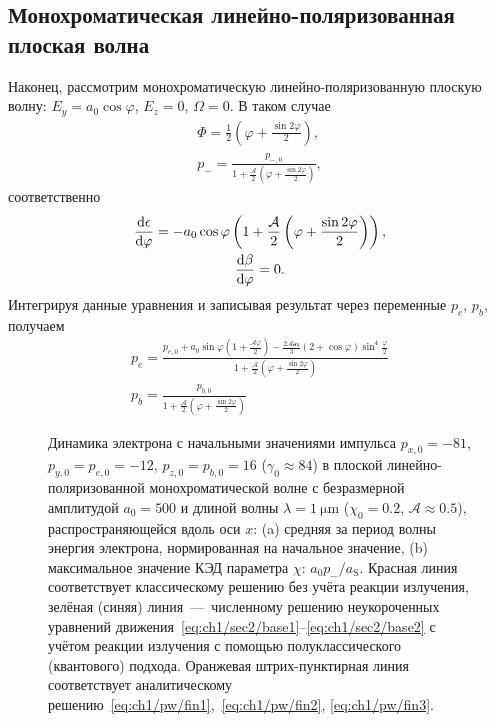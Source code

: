 \subsection{Монохроматическая линейно-поляризованная плоская волна}
\label{sub:ch1/sec6/LPW}
Наконец, рассмотрим монохроматическую линейно-поляризованную плоскую волну: $E_y=a_0\cos\varphi$, $E_z=0$, $\Omega=0$.
В таком случае
\begin{gather}
    \Phi = \frac{1}{2} \left( \varphi + \frac{\sin2\varphi}{2} \right), \\
    \label{eq:ch1/pw/fin1}
    p_- = \frac{p_{-, 0}}{1 + \frac{\mathcal{A}}{2} \left( \varphi + \frac{\sin2\varphi}{2} \right)},
\end{gather}
соответственно
\begin{gather}
    \dv{\epsilon}{\varphi} =  -a_0 \cos\varphi \left(1+\frac{\mathcal{A}}{2} \left( \varphi + \frac{\sin2\varphi}{2} \right)\right) , \\
    \dv{\beta}{\varphi} = 0.
\end{gather}
Интегрируя данные уравнения и записывая результат через переменные $p_e$, $p_b$, получаем
\begin{gather}
    \label{eq:ch1/pw/fin2}
    p_e = \frac{p_{e,0}+a_0\sin\varphi\left(1 + \frac{\mathcal{A}\varphi}{2}\right) - \frac{2 \mathcal{Aa_0}}{3} (2 + \cos\varphi)\sin^4\frac{\varphi}{2}}{1+\frac{\mathcal{A}}{2} \left( \varphi + \frac{\sin2\varphi}{2} \right)} \\
    \label{eq:ch1/pw/fin3}
    p_b = \frac{p_{b, 0}}{1+\frac{\mathcal{A}}{2} \left( \varphi + \frac{\sin2\varphi}{2} \right)}
\end{gather}

\begin{figure}[ht]
    \caption[Динамика электрона в линейно-поляризованной монохроматической плоской волне]{
    Динамика электрона с начальными значениями импульса $p_{x, 0} = -81$, $p_{y, 0} = p_{e, 0} = -12$, $p_{z, 0} = p_{b,0} = 16$ ($\gamma_0 \approx 84$) в плоской линейно-поляризованной монохроматической волне с безразмерной амплитудой $a_0 = 500$ и длиной волны $\lambda = \SI{1}{\um}$ ($\chi_0 = 0.2$, $\mathcal{A}\approx 0.5$), распространяющейся вдоль оси $x$: (a) средняя за период волны энергия электрона, нормированная на начальное значение, (b) максимальное значение КЭД параметра $\chi$: $a_0 p_-/a_\mathrm{S}$. Красная линия соответствует классическому решению без учёта реакции излучения, зелёная (синяя) линия~---~численному решению неукороченных уравнений движения~\eqref{eq:ch1/sec2/base1}--\eqref{eq:ch1/sec2/base2} с учётом реакции излучения с помощью полуклассического (квантового) подхода. Оранжевая штрих-пунктирная линия соответствует аналитическому решению~\eqref{eq:ch1/pw/fin1},~\eqref{eq:ch1/pw/fin2}, \eqref{eq:ch1/pw/fin3}. 
    }
    \label{fig:ch1/sec5/lpw}
\end{figure}

